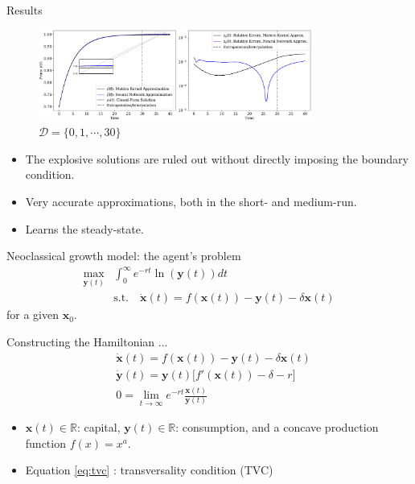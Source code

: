 \documentclass[aspectratio=169,10pt]{beamer}
\begin{document}
\begin{frame}{Results}
	\begin{figure}[t!]
		\centering
		\includegraphics[width=0.8\textwidth]{figs/asset_pricing_contiguous.pdf}
		\caption*{$\mathcal{D} = \{0,1,\cdots,30\}$}
		\vspace{-4mm}
	\end{figure}
	\begin{itemize}
		\item The explosive solutions are ruled out without directly imposing the boundary condition.
		\vspace{0.1in}
		\item Very accurate approximations, both in the short- and medium-run.
		\vspace{0.1in}
		\item Learns the steady-state.
	\end{itemize}
\end{frame}

\begin{frame}{Neoclassical growth model: the agent's problem}
	\begin{align*}
		\max_{\mathbf{y}(t)} &\int_0^\infty e^{-rt}\ln(\mathbf{y}(t))dt\\
		& \text{s.t.} \quad \dot{\mathbf{x}}(t) = f(\mathbf{x}(t)) - \mathbf{y}(t)-\delta \mathbf{x}(t)
	\end{align*}
for a given $\mathbf{x}_0$.


Constructing the Hamiltonian ...
	\begin{align}
		&\dot{\mathbf{x}}(t) = f(\mathbf{x}(t)) - \mathbf{y}(t)-\delta \mathbf{x}(t)\\
		&\dot{\mathbf{y}}(t) = \mathbf{y}(t)\big[f'(\mathbf{x}(t)) -\delta -r\big]\\
		& 0 = \lim_{t\rightarrow \infty} e^{-rt}\frac{\mathbf{x}(t)}{\mathbf{y}(t)}
		\label{eq:tvc}
	\end{align}
	\begin{itemize}
		\item $\mathbf{x}(t)\in \mathbb{R}$: capital, $\mathbf{y}(t)\in \mathbb{R}$: consumption, and a concave production function $f(x) = x^a$.
		\vspace{0.1in}
		\item Equation \cref{eq:tvc} : transversality condition (TVC)
	\end{itemize}
\end{frame}
\end{document}
